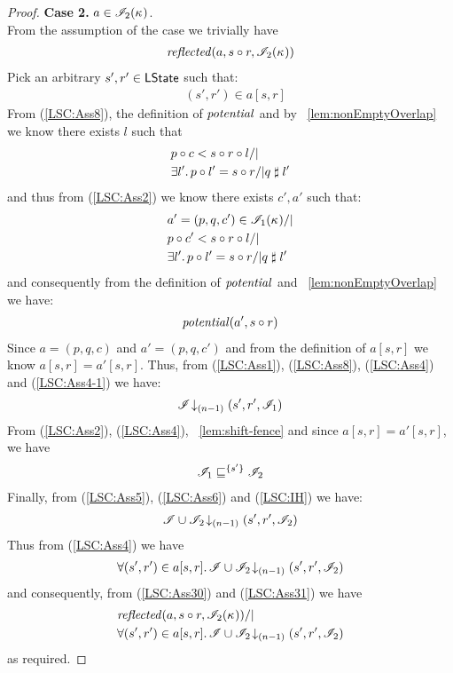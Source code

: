 \begin{lemma}
\begin{proof}
\noindent\textbf{Case 2. } $a \in \mathscr{I}_2(\kappa_{})$.\\
From the assumption of the case we trivially have
\begin{align}
	\mathit{reflected}(a, s \circ r, \mathscr{I}_2(\kappa_{}))
	\label{LSC:Ass30}
\end{align}
%
Pick an arbitrary $s', r' \in \textsf{LState}$ such that:
\begin{align}
	&(s', r') \in a[s, r] \label{LSC:Ass4}
\end{align}
From (\ref{LSC:Ass8}), the definition of $\mathit{potential}$ and by \lem~\ref{lem:nonEmptyOverlap} we know there exists $l$ such that 
%
\begin{align*}
	& p \composeL c < s \composeL r \composeL l /| \null\\
	& \exsts{l'} p \composeL l' = s \composeL r /| q \compatible l'
\end{align*}
%
and thus from (\ref{LSC:Ass2}) we know there exists $c', a'$  such that:
%
\begin{align*}
	& a' = (p, q, c') \in \lmod_1(\ca{}) /|\\
	& p \composeL c' < s \composeL r \composeL l /| \null\\
	& \exsts{l'} p \composeL l' = s \composeL r /| q \compatible l'
\end{align*}
%
and consequently from the definition of $\mathit{potential}$ and \lem~\ref{lem:nonEmptyOverlap} we have: 
%
\begin{align}
	\mathit{potential}(a', s \circ r) \label{LSC:Ass4-1}
\end{align}
Since $a = (p, q, c)$ and $a' = (p, q, c')$ and from the definition of $a[s, r]$ we know $a[s, r] = a'[s, r]$. Thus, from (\ref{LSC:Ass1}), (\ref{LSC:Ass8}), (\ref{LSC:Ass4}) and (\ref{LSC:Ass4-1}) we have:
%
\begin{align}
	\mathscr{I} \!\downarrow_{(n-1)} \left(s', r', \mathscr{I}_1\right) \label{LSC:Ass5}
\end{align}
%
From (\ref{LSC:Ass2}), (\ref{LSC:Ass4}), \lem~\ref{lem:shift-fence} and since $a[s, r] = a'[s, r]$, we have
%
\begin{align}
	\mathscr{I}_1 \sqsubseteq^{\{s'\}} \mathscr{I}_2 \label{LSC:Ass6}
\end{align}
%
Finally, from (\ref{LSC:Ass5}), (\ref{LSC:Ass6}) and (\ref{LSC:IH}) we have:
%
\begin{align*}
	\mathscr{I} \cup \mathscr{I}_2 \!\downarrow_{(n-1)} \left(s', r', \mathscr{I}_2\right)
\end{align*}
%
Thus from (\ref{LSC:Ass4}) we have
%
\begin{align}
	\forall (s', r') \in a[s, r].\, \mathscr{I} \cup \mathscr{I}_2 \!\downarrow_{(n-1)} \left(s', r', \mathscr{I}_2\right)
	\label{LSC:Ass31}
\end{align}
%
and consequently, from (\ref{LSC:Ass30}) and (\ref{LSC:Ass31}) we have
%
\begin{align*}
	&\mathit{reflected}(a, s \circ r, \mathscr{I}_2(\kappa_{})) /| \\
	&\forall (s', r') \in a[s, r].\, \mathscr{I} \cup \mathscr{I}_2 \!\downarrow_{(n-1)} \left(s', r', \mathscr{I}_2\right)
\end{align*}
%
as required.
%
%
%
%


\end{proof}
\end{lemma}
